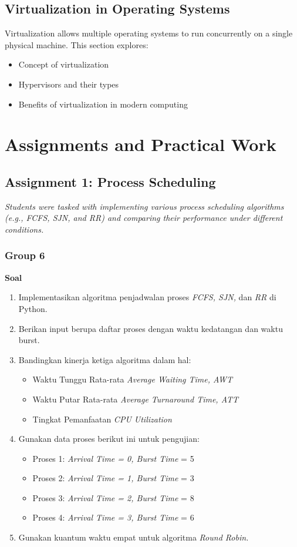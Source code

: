 \documentclass[12pt]{article}
\begin{document}
\subsection{Virtualization in Operating Systems}
Virtualization allows multiple operating systems to run concurrently on a single physical machine. This section explores:
\begin{itemize}
    \item Concept of virtualization
    \item Hypervisors and their types
    \item Benefits of virtualization in modern computing
\end{itemize}

\section{Assignments and Practical Work}
\subsection{Assignment 1: Process Scheduling}
\textit{Students were tasked with implementing various process scheduling algorithms (e.g., FCFS, SJN, and RR) and comparing their performance under different conditions.}

\subsubsection{Group 6}
\vspace{0.5cm}
\textbf{Soal}
\begin{enumerate}
    \item Implementasikan algoritma penjadwalan proses \textit{FCFS, SJN,} dan \textit{RR} di Python.
    \item Berikan input berupa daftar proses dengan waktu kedatangan dan waktu burst.
    \item Bandingkan kinerja ketiga algoritma dalam hal:
    \begin{itemize}
        \item Waktu Tunggu Rata-rata \textit{Average Waiting Time, AWT}
        \item Waktu Putar Rata-rata \textit{Average Turnaround Time, ATT}
        \item Tingkat Pemanfaatan \textit{CPU Utilization}
    \end{itemize}
    \item Gunakan data proses berikut ini untuk pengujian:
    \begin{itemize}
        \item Proses 1: \textit{Arrival Time = 0, Burst Time} = 5
        \item Proses 2: \textit{Arrival Time = 1, Burst Time} = 3
        \item Proses 3: \textit{Arrival Time = 2, Burst Time} = 8
        \item Proses 4: \textit{Arrival Time = 3, Burst Time} = 6
    \end{itemize}
    \item Gunakan kuantum waktu empat untuk algoritma \textit{Round Robin.}
\end{enumerate}
\end{document}

